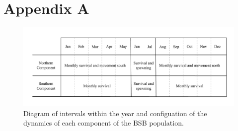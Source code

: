 \documentclass[
]{article}
\begin{document}
\pagebreak

\hypertarget{appendix-a}{%
\section*{Appendix A}\label{appendix-a}}

\setcounter{table}{0}
\renewcommand\thetable{A\arabic{table}}


\pagebreak

\begin{figure}

{\centering \includegraphics[width=0.8\linewidth]{bsb_movement_diagram} 

}

\caption{Diagram of intervals within the year and configuation of the dynamics of each component of the BSB population.}\label{fig:migration-diagram}
\end{figure}

\setcounter{table}{0}
\renewcommand\thetable{\arabic{table}}
\end{document}
